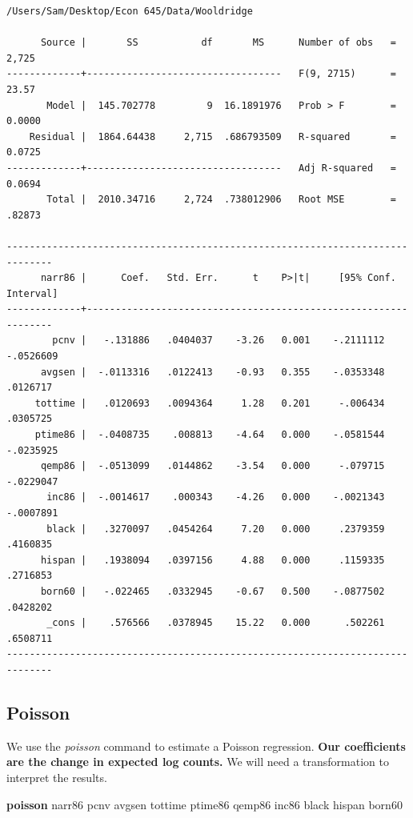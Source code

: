 \documentclass[
]{book}
\newenvironment{Shaded}{\begin{snugshade}}{\end{snugshade}}
\newcommand{\BaseNTok}[1]{\textcolor[rgb]{0.00,0.00,0.81}{#1}}
\newcommand{\KeywordTok}[1]{\textcolor[rgb]{0.13,0.29,0.53}{\textbf{#1}}}
\newcommand{\NormalTok}[1]{#1}
\begin{document}
\begin{verbatim}
/Users/Sam/Desktop/Econ 645/Data/Wooldridge

      Source |       SS           df       MS      Number of obs   =     2,725
-------------+----------------------------------   F(9, 2715)      =     23.57
       Model |  145.702778         9  16.1891976   Prob > F        =    0.0000
    Residual |  1864.64438     2,715  .686793509   R-squared       =    0.0725
-------------+----------------------------------   Adj R-squared   =    0.0694
       Total |  2010.34716     2,724  .738012906   Root MSE        =    .82873

------------------------------------------------------------------------------
      narr86 |      Coef.   Std. Err.      t    P>|t|     [95% Conf. Interval]
-------------+----------------------------------------------------------------
        pcnv |   -.131886   .0404037    -3.26   0.001    -.2111112   -.0526609
      avgsen |  -.0113316   .0122413    -0.93   0.355    -.0353348    .0126717
     tottime |   .0120693   .0094364     1.28   0.201     -.006434    .0305725
     ptime86 |  -.0408735    .008813    -4.64   0.000    -.0581544   -.0235925
      qemp86 |  -.0513099   .0144862    -3.54   0.000     -.079715   -.0229047
       inc86 |  -.0014617    .000343    -4.26   0.000    -.0021343   -.0007891
       black |   .3270097   .0454264     7.20   0.000     .2379359    .4160835
      hispan |   .1938094   .0397156     4.88   0.000     .1159335    .2716853
      born60 |   -.022465   .0332945    -0.67   0.500    -.0877502    .0428202
       _cons |    .576566   .0378945    15.22   0.000      .502261    .6508711
------------------------------------------------------------------------------
\end{verbatim}

\subsection*{Poisson}\label{poisson}

We use the \emph{poisson} command to estimate a Poisson regression. \textbf{Our coefficients are the change in expected log counts.} We will need a transformation to interpret the results.

\begin{Shaded}
\begin{Highlighting}[]
\KeywordTok{poisson}\NormalTok{ narr86 pcnv avgsen tottime ptime86 qemp86 inc86 }\BaseNTok{black}\NormalTok{ hispan born60 }
\end{Highlighting}
\end{Shaded}
\end{document}
